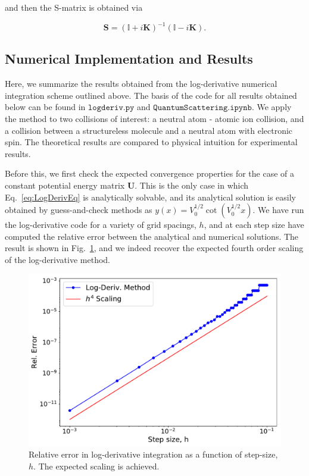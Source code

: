 \documentclass[%
 reprint,
 amsmath,amssymb,
 aps,
 nofootinbib
]{revtex4-1}
\begin{document}
\noindent and then the S-matrix is obtained via 

\begin{equation}
\mathbf{S} = \left(\mathbb{I} + i \mathbf{K}\right)^{-1} \left( \mathbb{I} - i \mathbf{K} \right).
\end{equation}

\subsection{Numerical Implementation and Results}
Here, we summarize the results obtained from the log-derivative numerical integration scheme outlined above. The basis of the code for all results obtained below can be found in $\texttt{logderiv.py}$ and $\texttt{QuantumScattering.ipynb}$. We apply the method to two collisions of interest: a neutral atom - atomic ion collision, and a collision between a structureless molecule and a neutral atom with electronic spin. The theoretical results are compared to physical intuition for experimental results. 

Before this, we first check the expected convergence properties for the case of a constant potential energy matrix $\mathbf{U}$. This is the only case in which Eq.~\ref{eq:LogDerivEq} is analytically solvable, and its analytical solution is easily obtained by guess-and-check methods as $y(x) = V_0^{1/2} \cot(V_0^{1/2} x)$. We have run the log-derivative code for a variety of grid spacings, $h$, and at each step size have computed the relative error between the analytical and numerical solutions. The result is shown in Fig.~\ref{fig:ConvCheck}, and we indeed recover the expected fourth order scaling of the log-derivative method. 

\begin{figure}[b]
\includegraphics[width=1\columnwidth]{./Results/LogDerivErrorScaling}
\caption{Relative error in log-derivative integration as a function of step-size, $h$. The expected scaling is achieved.}
\label{fig:ConvCheck}
\end{figure}
\end{document}
